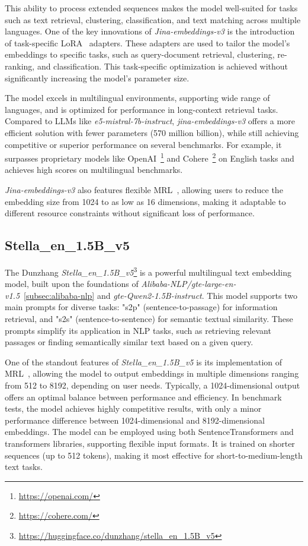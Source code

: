 This ability to process extended sequences makes the model well-suited for tasks such as text retrieval, clustering, classification, and text matching across multiple languages.
One of the key innovations of \textit{Jina-embeddings-v3} is the introduction of task-specific \ac{LoRA}~\cite{hu2022lora} adapters.
These adapters are used to tailor the model's embeddings to specific tasks, such as query-document retrieval, clustering, re-ranking, and classification.
This task-specific optimization is achieved without significantly increasing the model's parameter size.

The model excels in multilingual environments, supporting wide range of languages, and is optimized for performance in long-context retrieval tasks.
Compared to LLMs like \textit{e5-mistral-7b-instruct}, \textit{jina-embeddings-v3} offers a more efficient solution with fewer parameters (570 million  billion), while still achieving competitive or superior performance on several benchmarks.
For example, it surpasses proprietary models like OpenAI~\footnote{\url{https://openai.com/}} and Cohere~\footnote{\url{https://cohere.com/}} on English tasks and achieves high scores on multilingual benchmarks.

\textit{Jina-embeddings-v3} also features flexible \ac{MRL}~\cite{kusupati2024matryoshkarepresentationlearning}, allowing users to reduce the embedding size from 1024 to as low as 16 dimensions, making it adaptable to different resource constraints without significant loss of performance.

\subsection{Stella\_en\_1.5B\_v5}\label{subsec:dunzhang}
The Dunzhang \textit{Stella\_en\_1.5B\_v5}\footnote{\url{https://huggingface.co/dunzhang/stella_en_1.5B_v5}} is a powerful multilingual text embedding model, built upon the foundations of \textit{Alibaba-NLP/gte-large-en-v1.5}~\ref{subsec:alibaba-nlp} and \textit{gte-Qwen2-1.5B-instruct}.
This model supports two main prompts for diverse tasks: "s2p" (sentence-to-passage) for information retrieval, and "s2s" (sentence-to-sentence) for semantic textual similarity. 
These prompts simplify its application in NLP tasks, such as retrieving relevant passages or finding semantically similar text based on a given query.

One of the standout features of \textit{Stella\_en\_1.5B\_v5} is its implementation of \ac{MRL}~\cite{kusupati2024matryoshkarepresentationlearning}, allowing the model to output embeddings in multiple dimensions ranging from 512 to 8192, depending on user needs. 
Typically, a 1024-dimensional output offers an optimal balance between performance and efficiency. 
In benchmark tests, the model achieves highly competitive results, with only a minor performance difference between 1024-dimensional and 8192-dimensional embeddings.
The model can be employed using both SentenceTransformers and transformers libraries, supporting flexible input formats. 
It is trained on shorter sequences (up to 512 tokens), making it most effective for short-to-medium-length text tasks. 

